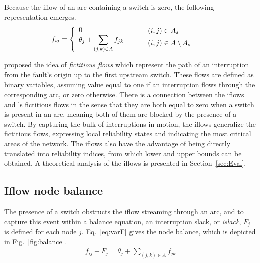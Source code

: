 \documentclass{article}
\begin{document}
Because the iflow of an arc containing a switch is zero, the following representation emerges.
\begin{align} 
\displaystyle
f_{ij} =
	\left \{
		\begin{array}{l l}
			0 \\
			\displaystyle \theta_{j} + \sum_{(j,k) \in A}{f_{jk}}   \\
		\end{array}
	\right. \quad
	\left .
		\begin{array}{l l}
			& (i,j) \in A_s \vspace{0.2cm} \\
			& (i,j) \in A \setminus A_{s} \vspace{0.2cm} \\
		\end{array}
	\right.	\qquad	
\label{eq:flow}
\end{align}

\cite{LiEtAl2020b} proposed the idea of \textit{fictitious flows} which represent the path of an interruption from the fault's origin up to the first upstream switch. These flows are defined as binary variables, assuming value equal to one if an interruption flows through the corresponding arc, or zero otherwise. There is a connection between the iflows and \cite{LiEtAl2020b}'s fictitious flows in the sense that they are both equal to zero when a switch is present in an arc, meaning both of them are blocked by the presence of a switch. By capturing the bulk of interruptions in motion, the iflows generalize the fictitious flows, expressing local reliability states and indicating the most critical areas of the network. The iflows also have the advantage of being directly translated into reliability indices, from which lower and upper bounds can be obtained. A theoretical analysis of the iflows is presented in Section~\ref{sec:Eval}.

\subsection{Iflow node balance}

The presence of a switch obstructs the iflow streaming through an arc, and to capture this event within a balance equation, an interruption slack, or \textit{islack}, $F_j$ is defined for each node $j$. Eq.~\eqref{eq:varF} gives the node balance, which is depicted in Fig.~\ref{fig:balance}.
\begin{align}  
\displaystyle f_{ij} + F_j = \theta_j + \sum_{(j,k) \in A}{f_{jk}} \label{eq:varF}
\end{align}
\end{document}
